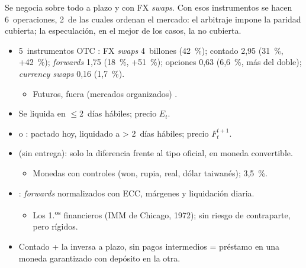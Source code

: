 \documentclass{article}
\begin{document}
\begin{columnas}
\begin{ideaclave}
Se negocia sobre todo a plazo y con FX \emph{swaps}. Con esos instrumentos se hacen 6~operaciones, 2~de las cuales ordenan el mercado: el arbitraje impone la paridad cubierta; la especulación, en el mejor de los casos, la no cubierta.
\end{ideaclave}

\begin{itemize}
\item 5~instrumentos OTC : FX \emph{swaps} 4~billones (42~\%); contado 2,95 (31~\%, +42~\%); \emph{forwards} 1,75 (18~\%, +51~\%); opciones 0,63 (6,6~\%, más del doble); \emph{currency swaps} 0,16 (1,7~\%).
  \begin{itemize}
  \item Futuros, fuera (mercados organizados) .
  \end{itemize}
\end{itemize}
\begin{itemize}
\item Se liquida en $\leq$2~días hábiles; precio $E_t$.
\end{itemize}
\begin{itemize}
\item {} o : pactado hoy, liquidado a > 2~días hábiles; precio $F_t^{t+1}$.
\item {} (sin entrega): solo la diferencia frente al tipo oficial, en moneda convertible.
  \begin{itemize}
  \item Monedas con controles (won, rupia, real, dólar taiwanés); 3,5~\%.
  \end{itemize}
\item {}: \emph{forwards} normalizados con ECC, márgenes y liquidación diaria.
  \begin{itemize}
  \item Los 1.\textsuperscript{os} financieros (IMM de Chicago, 1972); sin riesgo de contraparte, pero rígidos.
  \end{itemize}
\end{itemize}
\begin{itemize}
\item Contado + la inversa a plazo, sin pagos intermedios = préstamo en una moneda garantizado con depósito en la otra.

\end{itemize}
\end{columnas}
\end{document}
